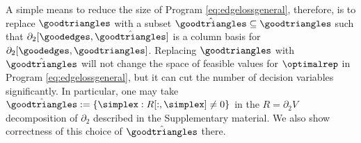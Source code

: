 A simple means to reduce the size of Program \eqref{eq:edgelossgeneral}, therefore, is to replace $\goodtriangles$ with a subset $\hat \goodtriangles \subseteq \goodtriangles$ such that $\partial_2[\goodedges, \hat \goodtriangles]$ is a column basis for $\partial_2[\goodedges, \goodtriangles]$.  Replacing $\goodtriangles$ with $\hat \goodtriangles$ will not change the space of feasible values for $\optimalrep$ in Program \eqref{eq:edgelossgeneral}, but it can cut the number of decision variables significantly. In particular, one may take $\hat \goodtriangles : = \{ \simplex : R[:, \simplex] \neq 0\}$ in the $R = \partial_2 V$ decomposition of $\partial_2$ described in the Supplementary material.  We also show correctness of this choice of $\hat \goodtriangles$ there.
 






